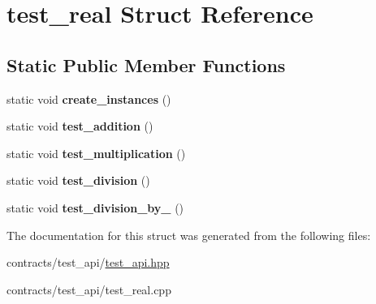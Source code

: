 \hypertarget{structtest__real}{}\section{test\+\_\+real Struct Reference}
\label{structtest__real}
\subsection*{Static Public Member Functions}
\begin{DoxyCompactItemize}
\item 
\mbox{\label{structtest__real_a16d4bc170ecefe71a5ee149c84d9f02f}} 
static void {\bfseries create\+\_\+instances} ()
\item 
\mbox{\label{structtest__real_a42dfdfc3eb080c4b3d0150301093fe7d}} 
static void {\bfseries test\+\_\+addition} ()
\item 
\mbox{\label{structtest__real_a2db042a018d919183601bece014e8807}} 
static void {\bfseries test\+\_\+multiplication} ()
\item 
\mbox{\label{structtest__real_a667d36237be1f534fbec5b9c5f3c2f62}} 
static void {\bfseries test\+\_\+division} ()
\item 
\mbox{\label{structtest__real_aaa7db7952749e78288d3c6ef1bb5312b}} 
static void {\bfseries test\+\_\+division\+\_\+by\+\_} ()
\end{DoxyCompactItemize}


The documentation for this struct was generated from the following files\+:\begin{DoxyCompactItemize}
\item 
contracts/test\+\_\+api/\mbox{\hyperlink{test__api_8hpp}{test\+\_\+api.\+hpp}}\item 
contracts/test\+\_\+api/test\+\_\+real.\+cpp\end{DoxyCompactItemize}

